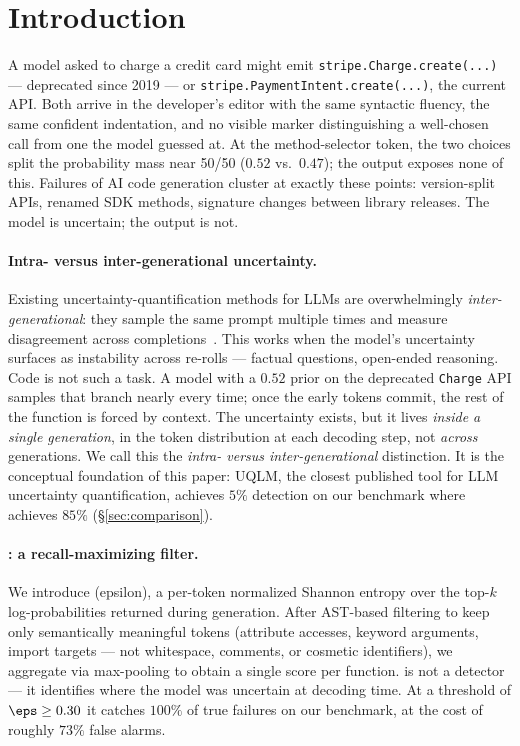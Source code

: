 \section{Introduction}
\label{sec:introduction}

A model asked to charge a credit card might emit
\texttt{stripe.Charge.create(...)} --- deprecated since 2019 --- or
\texttt{stripe.PaymentIntent.create(...)}, the current API. Both arrive in
the developer's editor with the same syntactic fluency, the same confident
indentation, and no visible marker distinguishing a well-chosen call from
one the model guessed at. At the method-selector token, the two choices
split the probability mass near 50/50 ($0.52$ vs.\ $0.47$); the output
exposes none of this. Failures of AI code generation cluster at exactly
these points: version-split APIs, renamed SDK methods, signature changes
between library releases. The model is uncertain; the output is not.

\paragraph{Intra- versus inter-generational uncertainty.}
Existing uncertainty-quantification methods for LLMs are overwhelmingly
\emph{inter-generational}: they sample the same prompt multiple times and
measure disagreement across completions~\cite{kuhn2023semantic,uqlm2024}.
This works when the model's uncertainty surfaces as instability across
re-rolls --- factual questions, open-ended reasoning. Code is not such a
task. A model with a $0.52$ prior on the deprecated \texttt{Charge} API
samples that branch nearly every time; once the early tokens commit, the
rest of the function is forced by context. The uncertainty exists, but it
lives \emph{inside a single generation}, in the token distribution at each
decoding step, not \emph{across} generations. We call this the
\emph{intra- versus inter-generational} distinction. It is the conceptual
foundation of this paper: UQLM, the closest published tool for LLM
uncertainty quantification, achieves $5\%$ detection on our benchmark
where \eps achieves $85\%$ (\S\ref{sec:comparison}).

\paragraph{\eps: a recall-maximizing filter.}
We introduce \eps (epsilon), a per-token normalized Shannon entropy over
the top-$k$ log-probabilities returned during generation. After AST-based
filtering to keep only semantically meaningful tokens (attribute accesses,
keyword arguments, import targets --- not whitespace, comments, or
cosmetic identifiers), we aggregate via max-pooling to obtain a single
score per function. \eps is not a detector --- it identifies where the
model was uncertain at decoding time. At a threshold of $\eps \ge 0.30$
it catches $100\%$ of true failures on our benchmark, at the cost of
roughly $73\%$ false alarms.


